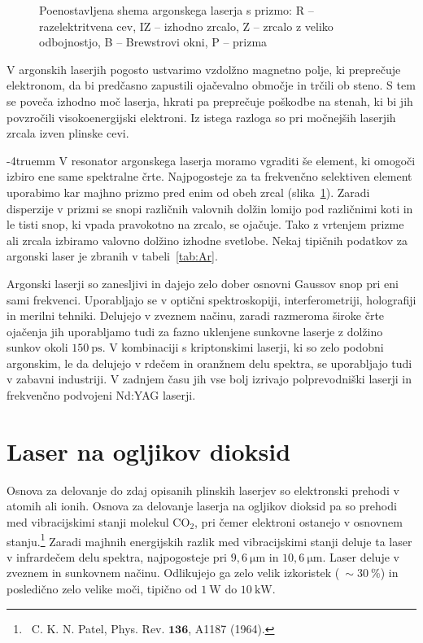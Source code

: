 \begin{figure}[ht]
\centering
\def\svgwidth{100truemm} 

\caption{Poenostavljena shema argonskega laserja s prizmo: R -- razelektritvena cev, 
IZ -- izhodno zrcalo, Z -- zrcalo z veliko odbojnostjo, B -- Brewstrovi okni,
P -- prizma
}
\label{fig:ArS}
\end{figure}

\begin{remark}
V argonskih laserjih pogosto ustvarimo vzdolžno magnetno polje, ki preprečuje 
elektronom, da bi predčasno zapustili ojačevalno območje in trčili ob steno. S
tem se poveča izhodno moč laserja, hkrati pa preprečuje poškodbe na stenah, ki bi jih 
povzročili visokoenergijski elektroni. Iz istega razloga so pri močnejših
laserjih zrcala izven plinske cevi. 
\end{remark}
\vglue-4truemm
V resonator argonskega laserja moramo vgraditi še element, ki omogoči
izbiro ene same spektralne črte. Najpogosteje za ta frekvenčno selektiven element
uporabimo kar majhno prizmo pred enim od obeh zrcal (slika~\ref{fig:ArS}). Zaradi disperzije
v prizmi se snopi različnih valovnih dolžin lomijo pod različnimi koti in le tisti 
snop, ki vpada pravokotno na zrcalo, se ojačuje. Tako z vrtenjem prizme ali zrcala 
izbiramo valovno dolžino izhodne svetlobe. Nekaj tipičnih podatkov za argonski
laser je zbranih v tabeli~\ref{tab:Ar}.

Argonski laserji so zanesljivi in dajejo zelo dober osnovni Gaussov snop pri eni
sami frekvenci. Uporabljajo se v optični spektroskopiji,
interferometriji, holografiji in merilni tehniki. Delujejo v zveznem načinu,
zaradi razmeroma široke črte ojačenja jih uporabljamo tudi za fazno uklenjene
sunkovne laserje z dolžino sunkov okoli $150~\si{\pico\second}$. 
V kombinaciji s kriptonskimi laserji, ki so zelo podobni argonskim, le da delujejo
v rdečem in oranžnem delu spektra, se uporabljajo tudi v zabavni industriji.
V zadnjem času jih vse bolj izrivajo polprevodniški laserji in frekvenčno
podvojeni Nd:YAG laserji. 

\section{Laser na ogljikov dioksid}
Osnova za delovanje do zdaj opisanih plinskih laserjev so elektronski prehodi
v atomih ali ionih. Osnova za delovanje laserja na ogljikov dioksid pa so 
prehodi med vibracijskimi stanji molekul 
CO$_2$, pri čemer elektroni ostanejo v osnovnem stanju.\footnote{~C. K. N. Patel,
Phys. Rev. $\mathbf{136}$, A1187 (1964).}
Zaradi majhnih energijskih razlik med vibracijskimi stanji deluje
ta laser v infrardečem delu spektra, najpogosteje pri 
$9,6~\si{\micro\metre}$ in $10,6~\si{\micro\metre}$. Laser deluje v zveznem
in sunkovnem načinu. Odlikujejo ga zelo velik izkoristek ($~\sim 30~\%$) in 
posledično zelo velike moči, tipično od $1~\si{\watt}$ do $10~\si{\kilo\watt}$. 

